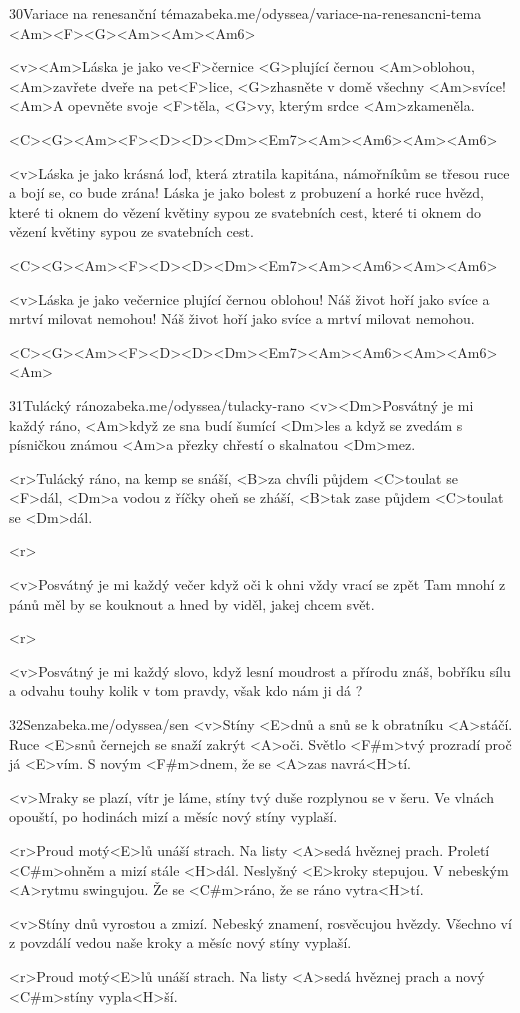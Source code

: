 \begin{song}{30}{Variace na renesanční téma}{zabeka.me/odyssea/variace-na-renesancni-tema}
	<Am><F><G><Am><Am><Am6>

	<v><Am>Láska je jako ve<F>černice <G>plující černou <Am>oblohou,
	<Am>zavřete dveře na pet<F>lice, <G>zhasněte v domě všechny <Am>svíce!
	<Am>A opevněte svoje <F>těla, <G>vy, kterým srdce <Am>zkameněla.

	<C><G><Am><F><D><D><Dm><Em7><Am><Am6><Am><Am6>

	<v>Láska je jako krásná loď, která ztratila kapitána,
	námořníkům se třesou ruce a bojí se, co bude zrána!
	Láska je jako bolest z probuzení a horké ruce hvězd,
	které ti oknem do vězení květiny sypou ze svatebních cest,
	které ti oknem do vězení květiny sypou ze svatebních cest.

	<C><G><Am><F><D><D><Dm><Em7><Am><Am6><Am><Am6>

	<v>Láska je jako večernice plující černou oblohou!
	Náš život hoří jako svíce a mrtví milovat nemohou!
	Náš život hoří jako svíce a mrtví milovat nemohou.

	<C><G><Am><F><D><D><Dm><Em7><Am><Am6><Am><Am6><Am>

\end{song}
\begin{song}[Nedvědi]{31}{Tulácký ráno}{zabeka.me/odyssea/tulacky-rano}
	<v><Dm>Posvátný je mi každý ráno,
	<Am>když ze sna budí šumící <Dm>les
	a když se zvedám s písničkou známou
	<Am>a přezky chřestí o skalnatou <Dm>mez.

	<r>Tulácký ráno, na kemp se snáší,
	<B>za chvíli půjdem <C>toulat se <F>dál,
	<Dm>a vodou z říčky oheň se zháší,
	<B>tak zase půjdem <C>toulat se <Dm>dál.

	<r>

	<v>Posvátný je mi každý večer
	když oči k ohni vždy vrací se zpět
	Tam mnohí z pánů měl by se kouknout
	a hned by viděl, jakej chcem svět.

	<r>

	<v>Posvátný je mi každý slovo,
	když lesní moudrost a přírodu znáš,
	bobříku sílu a odvahu touhy
	kolik v tom pravdy, však kdo nám ji dá ?
\end{song}
\begin{song}[Lucie]{32}{Sen}{zabeka.me/odyssea/sen}
	<v>Stíny <E>dnů a snů se k obratníku <A>stáčí.
	Ruce <E>snů černejch se snaží zakrýt <A>oči.
	Světlo <F#m>tvý prozradí proč já <E>vím.
	S novým <F#m>dnem, že se <A>zas navrá<H>tí.

	<v>Mraky se plazí, vítr je láme,
	stíny tvý duše rozplynou se v šeru.
	Ve vlnách opouští, po hodinách mizí
	a měsíc nový stíny vyplaší.

	<r>Proud motý<E>lů unáší strach.
	Na listy <A>sedá hvěznej prach.
	Proletí <C#m>ohněm a mizí stále <H>dál.
	Neslyšný <E>kroky stepujou.
	V nebeským <A>rytmu swingujou.
	Že se <C#m>ráno, že se ráno vytra<H>tí.

	<v>Stíny dnů vyrostou a zmizí.
	Nebeský znamení, rosvěcujou hvězdy.
	Všechno ví z povzdálí vedou naše kroky
	a měsíc nový stíny vyplaší.

	<r>Proud motý<E>lů unáší strach.
	Na listy <A>sedá hvěznej prach
	a nový <C#m>stíny vypla<H>ší.
\end{song}
